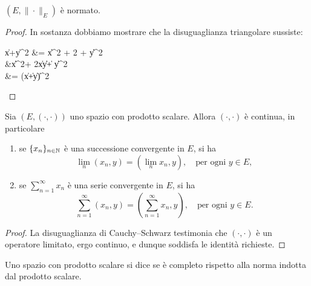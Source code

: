 \begin{lemma}
	 $(E, \|\cdot\|_E)$ è normato.
\end{lemma}
\begin{proof}
	In sostanza dobbiamo mostrare che la disuguaglianza triangolare sussiste:
	\begin{eqalign*}
		\|x+y\|^2 &= \|x\|^2 + 2  + \|y\|^2\\
		&\leq \|x\|^2+ 2\|x\|\|y\| + \|y\|^2\\
		&= (\|x\|+\|y\|)^2
	\end{eqalign*}
\end{proof}

\begin{lemma}
	Sia $(E, (\cdot,\cdot))$ uno spazio con prodotto scalare.
	Allora $(\cdot,\cdot)$ è continua, in particolare
	\begin{enumerate}
		\item se $\{x_n\}_{n \in \mathbb{N}}$ è una successione convergente in $E$, si ha
		\begin{equation*}
			\lim_n (x_n, y) = (\lim_n x_n, y), \quad \text{per ogni $y \in E$},
		\end{equation*}
		\item se $\sum_{n=1}^\infty x_n$ è una serie convergente in $E$, si ha
		\begin{equation*}
			\sum_{n=1}^\infty (x_n, y) = ({\textstyle \sum_{n=1}^\infty} x_n, y), \quad \text{per ogni $y \in E$}.
		\end{equation*}
	\end{enumerate}
\end{lemma}
\begin{proof}
	La disuguaglianza di Cauchy--Schwarz testimonia che $(\cdot, \cdot)$ è un operatore limitato, ergo continuo, e dunque soddisfa le identità richieste.
\end{proof}

\begin{definition}
	Uno spazio con prodotto scalare si dice  se è completo rispetto alla norma indotta dal prodotto scalare.
\end{definition}

